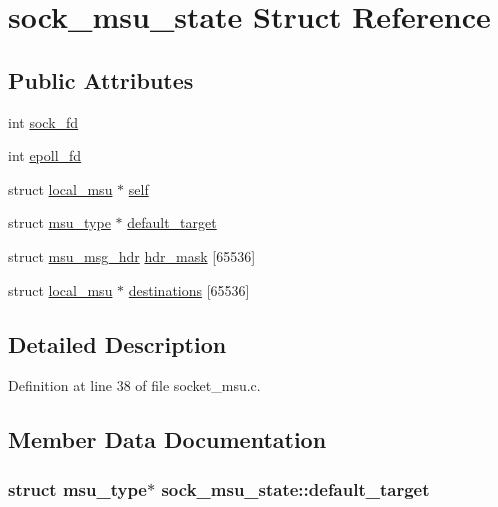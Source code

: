 \hypertarget{structsock__msu__state}{\section{sock\-\_\-msu\-\_\-state Struct Reference}
\label{structsock__msu__state}
}
\subsection*{Public Attributes}
\begin{DoxyCompactItemize}
\item 
int \hyperlink{structsock__msu__state_a7621ea37a55e4419bd2e35da3be10ae3}{sock\-\_\-fd}
\item 
int \hyperlink{structsock__msu__state_ad759ccb29fb3de7b6dda139dbde0e825}{epoll\-\_\-fd}
\item 
struct \hyperlink{structlocal__msu}{local\-\_\-msu} $\ast$ \hyperlink{structsock__msu__state_a041ff140d8b0451b98418ea68dc4f62c}{self}
\item 
struct \hyperlink{structmsu__type}{msu\-\_\-type} $\ast$ \hyperlink{structsock__msu__state_a89ea075e5eae4953216654fa556522cb}{default\-\_\-target}
\item 
struct \hyperlink{structmsu__msg__hdr}{msu\-\_\-msg\-\_\-hdr} \hyperlink{structsock__msu__state_ab195dc5130a98fdf868543dc6e153fcb}{hdr\-\_\-mask} \mbox{[}65536\mbox{]}
\item 
struct \hyperlink{structlocal__msu}{local\-\_\-msu} $\ast$ \hyperlink{structsock__msu__state_a316dd9a4f75911daa33496088766b3da}{destinations} \mbox{[}65536\mbox{]}
\end{DoxyCompactItemize}


\subsection{Detailed Description}


Definition at line 38 of file socket\-\_\-msu.\-c.



\subsection{Member Data Documentation}
\hypertarget{structsock__msu__state_a89ea075e5eae4953216654fa556522cb}{
\subsubsection[{default\-\_\-target}]{\setlength{\rightskip}{0pt plus 5cm}struct {\bf msu\-\_\-type}$\ast$ sock\-\_\-msu\-\_\-state\-::default\-\_\-target}}\label{structsock__msu__state_a89ea075e5eae4953216654fa556522cb}


